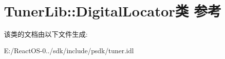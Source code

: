 \hypertarget{class_tuner_lib_1_1_digital_locator}{}\section{Tuner\+Lib\+:\+:Digital\+Locator类 参考}
\label{class_tuner_lib_1_1_digital_locator}


该类的文档由以下文件生成\+:\begin{DoxyCompactItemize}
\item 
E\+:/\+React\+O\+S-\/0../sdk/include/psdk/tuner.\+idl\end{DoxyCompactItemize}
